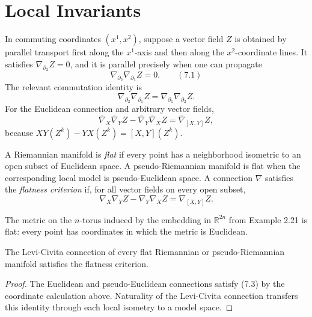 \section{Local Invariants}

In commuting coordinates $(x^1,x^2)$, suppose a vector field $Z$ is obtained
by parallel transport first along the $x^1$-axis and then along the
$x^2$-coordinate lines. It satisfies $\nabla_{\partial_2}Z=0$, and it is
parallel precisely when one can propagate
\[
\nabla_{\partial_2}\nabla_{\partial_1}Z=0. \qquad (7.1)
\]
The relevant commutation identity is
\begin{equation}
\nabla_{\partial_2}\nabla_{\partial_1}Z
=\nabla_{\partial_1}\nabla_{\partial_2}Z. \tag{7.2}
\end{equation}
For the Euclidean connection and arbitrary vector fields,
\[
\overline\nabla_X\overline\nabla_YZ
-\overline\nabla_Y\overline\nabla_XZ
=\overline\nabla_{[X,Y]}Z,
\]
because $XY(Z^k)-YX(Z^k)=[X,Y](Z^k)$.

A Riemannian manifold is \emph{flat} if every point has a neighborhood
isometric to an open subset of Euclidean space. A pseudo-Riemannian manifold is
flat when the corresponding local model is pseudo-Euclidean space. A
connection $\nabla$ satisfies the \emph{flatness criterion} if, for all vector
fields on every open subset,
\begin{equation}
\nabla_X\nabla_YZ-\nabla_Y\nabla_XZ=\nabla_{[X,Y]}Z. \tag{7.3}
\end{equation}

\begin{example}
\label{ex:n-torus-flat-metric}
The metric on the $n$-torus induced by the embedding in $\mathbb R^{2n}$ from
Example 2.21 is flat: every point has coordinates in which the metric is
Euclidean.
\end{example}

\begin{proposition}
\label{prop:flat-manifold-levi-civita-flatness}
The Levi-Civita connection of every flat Riemannian or pseudo-Riemannian
manifold satisfies the flatness criterion.
\end{proposition}

\begin{proof}
\sketch The Euclidean and pseudo-Euclidean connections satisfy (7.3) by the
coordinate calculation above. Naturality of the Levi-Civita connection
transfers this identity through each local isometry to a model space.
\end{proof}


